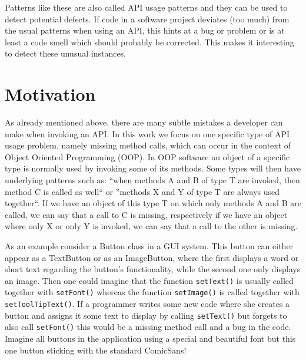 Patterns like these are also called API usage patterns \cite{robillard2013automated} and they can be used to detect potential defects.
If code in a software project deviates (too much) from the usual patterns when using an API, this hints at a bug or problem or is at least a code smell which should probably be corrected.
This makes it interesting to detect these unusual instances.

\section{Motivation}

As already mentioned above, there are many subtle mistakes a developer can make when invoking an API.
In this work we focus on one specific type of API usage problem, namely missing method calls, which can occur in the context of Object Oriented Programming (OOP).
In OOP software an object of a specific type is normally used by invoking some of its methods.
Some types will then have underlying patterns such as: ``when methods A and B of type T are invoked, then method C is called as well`` or ''methods X and Y of type T are always used together``.
If we have an object of this type T on which only methods A and B are called, we can say that a call to C is missing, respectively if we have an object where only X or only Y is invoked, we can say that a call to the other is missing.

As an example consider a Button class in a GUI system.
This button can either appear as a TextButton or as an ImageButton, where the first displays a word or short text regarding the button's functionality, while the second one only displays an image.
Then one could imagine that the function \texttt{setText()} is usually called together with \texttt{setFont()} whereas the function \texttt{setImage()} is called together with \texttt{setToolTipText()}.
If a programmer writes some new code where she creates a button and assigns it some text to display by calling \texttt{setText()} but forgets to also call \texttt{setFont()} this would be a missing method call and a bug in the code.
Imagine all buttons in the application using a special and beautiful font but this one button sticking with the standard ComicSans!

